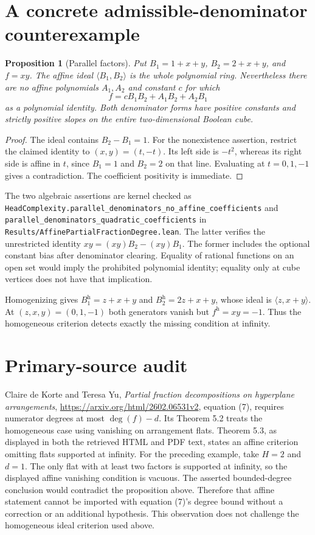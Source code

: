 \documentclass[11pt]{article}
\newtheorem{proposition}{Proposition}
\begin{document}
\section{A concrete admissible-denominator counterexample}

\begin{proposition}[Parallel factors]
Put $B_1=1+x+y$, $B_2=2+x+y$, and $f=xy$.
The affine ideal $\langle B_1,B_2\rangle$ is the whole polynomial ring.
Nevertheless there are no affine polynomials $A_1,A_2$ and constant
$c$ for which
\[
 f=cB_1B_2+A_1B_2+A_2B_1
\]
as a polynomial identity. Both denominator forms have positive
constants and strictly positive slopes on the entire two-dimensional
Boolean cube.
\end{proposition}
\begin{proof}
The ideal contains $B_2-B_1=1$. For the nonexistence assertion,
restrict the claimed identity to $(x,y)=(t,-t)$.
Its left side is $-t^2$, whereas its right side is affine in $t$,
since $B_1=1$ and $B_2=2$ on that line. Evaluating at $t=0,1,-1$
gives a contradiction. The coefficient positivity is immediate.
\end{proof}

The two algebraic assertions are kernel checked as
\texttt{HeadComplexity.parallel\_denominators\_no\_affine\_coefficients}
and \texttt{parallel\_denominators\_quadratic\_coefficients} in
\texttt{Results/AffinePartialFractionDegree.lean}.
The latter verifies the unrestricted identity
$xy=(xy)B_2-(xy)B_1$.
The former includes the optional constant bias after denominator
clearing. Equality of rational functions on an open set would imply
the prohibited polynomial identity; equality only at cube vertices
does not have that implication.

Homogenizing gives $B_1^{\mathrm h}=z+x+y$ and
$B_2^{\mathrm h}=2z+x+y$, whose ideal is
$\langle z,x+y\rangle$. At $(z,x,y)=(0,1,-1)$ both generators vanish
but $f^{\mathrm h}=xy=-1$. Thus the homogeneous criterion detects
exactly the missing condition at infinity.

\section{Primary-source audit}

Claire de Korte and Teresa Yu,
\emph{Partial fraction decompositions on hyperplane arrangements},
\url{https://arxiv.org/html/2602.06531v2}, equation (7), requires
numerator degrees at most $\deg(f)-d$. Its Theorem 5.2 treats the
homogeneous case using vanishing on arrangement flats.
Theorem 5.3, as displayed in both the retrieved HTML and PDF text,
states an affine criterion omitting flats supported at infinity.
For the preceding example, take $H=2$ and $d=1$. The only flat with
at least two factors is supported at infinity, so the displayed
affine vanishing condition is vacuous. The asserted bounded-degree
conclusion would contradict the proposition above. Therefore that
affine statement cannot be imported with equation (7)'s degree bound
without a correction or an additional hypothesis. This observation
does not challenge the homogeneous ideal criterion used above.
\end{document}
